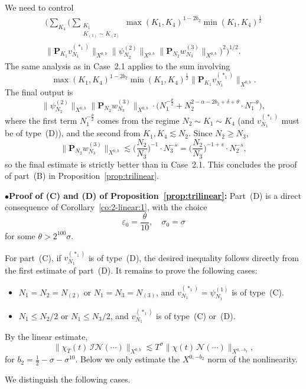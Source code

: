 \documentclass[11pt,reqno,english]{amsart}
\numberwithin{equation}{section}
\theoremstyle{plain}
\theoremstyle{definition}
\theoremstyle{remark}
\renewcommand{\epsilon}{\varepsilon}
\newcommand{\noi}{\noindent}
\begin{document}
We need to control
\begin{multline*}
	\Big(
	\sum_{K_4}
	\Big(
	\sum_{\substack{K_1\\
			K_{(1)}\sim K_{(2)}
	}}
	\max(K_1,K_4)^{1-2b_2}\min(K_1,K_4)^{\frac{1}{2}}
	\\
	\|\mathbf{P}_{K_1}v_{N_1}^{(\ast_1)}\|_{X^{0,b}}\|\psi_{N_2}^{(2)}\|_{X^{0,b}}\|\mathbf{P}_{N_2}w_{N_3}^{(3)}\|_{X^{0,b}}
	\Big)^{2}
	\Big)^{1/2}.
\end{multline*}
The same analysis as in Case~2.1 applies to the sum involving
\[
\max(K_1,K_4)^{1-2b_2}\min(K_1,K_4)^{\frac{1}{2}}\|\mathbf{P}_{K_1}v_{N_1}^{(\ast_1)}\|_{X^{0,b}}.
\]
The final output is
\[
\|\psi_{N_2}^{(2)}\|_{X^{0,b}}\|\mathbf{P}_{N_2}w_{N_3}^{(3)}\|_{X^{0,b}}\cdot \big(N_1^{-\frac{\theta}{2}}+N_2^{2-\alpha-2b_2+\delta+\theta}\cdot N_1^{-\theta}\big),
\]
where the first term $N_1^{-\frac{\theta}{2}}$ comes from the regime $N_2\sim K_1\sim K_4$ (and $v_{N_1}^{(\ast_1)}$ must be of type~(D)), and the second from $K_1,K_4\lesssim N_2$. Since $N_2\geq N_3$,
\[
\|\mathbf{P}_{N_2}w_{N_3}^{(3)}\|_{X^{0,b}}\lesssim \big(\frac{N_2}{N_3}\big)^{-1}\cdot N_3^{-s}=\big(\frac{N_2}{N_3}\big)^{-1+s}\cdot N_2^{-s},
\]
so the final estimate is strictly better than in Case~2.1. This concludes the proof of part~(B) in Proposition~\ref{prop:trilinear}.

\medskip

\noi
$\bullet${\bf Proof of (C) and (D) of Proposition~\ref{prop:trilinear}:} Part~(D) is a direct consequence of Corollary~\ref{co:2-linear:1}, with the choice
\[
\epsilon_0=\frac{\theta}{10},\quad \sigma_0=\sigma
\]
for some $\theta>2^{100}\sigma$.

For part~(C), if $v_{N_1}^{(\ast_1)}$ is of type~(D), the desired inequality follows directly from the first estimate of part~(D). It remains to prove the following cases:
\begin{itemize}
	\item $N_1= N_2=N_{(2)}$ or $N_1=N_3=N_{(3)}$, and $v_{N_1}^{(\ast_1)}=\psi_{N_1}^{(1)}$ is of type~(C).
	\item $N_1\leq N_2/2$ or $N_1\leq N_3/2$, and $v_{N_1}^{(\ast_1)}$ is of type~(C) or~(D).
\end{itemize}
By the linear estimate,
\[
\|\chi_T(t)\,\mathcal{I}\mathcal{N}(\cdots)\|_{X^{0,b}}\lesssim T^{\sigma}\|\chi(t)\,\mathcal{N}(\cdots)\|_{X^{0,-b_2}},
\]
for $b_2=\frac{1}{2}-\sigma-\sigma^{10}$. Below we only estimate the $X^{0,-b_2}$ norm of the nonlinearity.

We distinguish the following cases.
\end{document}
